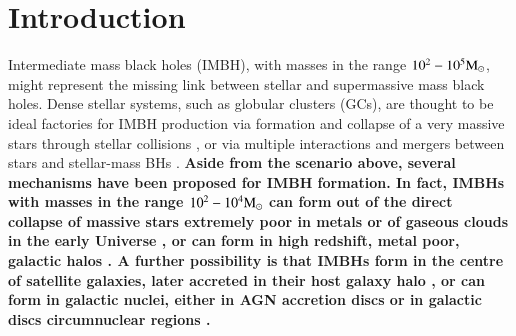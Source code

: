 \documentclass[article]{aa}
\newcommand{\Ms}{{\rm M}_\odot}
\begin{document}

\maketitle
%

\section{Introduction}

Intermediate mass black holes (IMBH), with masses in the range $10^2-10^5\Ms$, might represent the missing link between stellar and supermassive mass black holes. Dense stellar systems, such as globular clusters (GCs), are thought to be ideal factories for IMBH production via formation and collapse of a very massive stars through stellar collisions \citep{zwart02, freitag06b,freitag06c, giersz15, mapelli16},
or via multiple interactions and mergers between stars and stellar-mass BHs \citep{giersz15}. 
{\bf Aside from the scenario above, several mechanisms have been proposed for IMBH formation. In fact, IMBHs with masses in the range 
$10^2-10^4\Ms$ can form out of the direct collapse of massive stars extremely poor in metals \citep{madau01,bromm02,ohkubo09,spera17} or of gaseous clouds in the early Universe \citep{latif13}, or can form in high redshift, metal poor, galactic halos \citep{bellovary11}. A further possibility is that IMBHs form in the centre of satellite galaxies, later accreted in their host galaxy halo \citep{bellovary10}, or can form in galactic nuclei, either in AGN accretion discs \citep{mckernan12} or in galactic discs circumnuclear regions \citep{taniguchi00}.}
\end{document}
